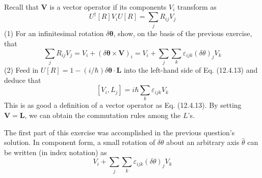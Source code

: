 \documentclass[../principles-of-quantum-mechanics.tex]{subfiles}
\begin{document}
\begin{questions}
	\question Recall that $\mathbf{V}$ is a vector operator if its components $V_i$ transform as
	$$U^\dagger[R]V_iU[R] = \sum_j R_{ij} V_j$$
	(1) For an infinitesimal rotation $\delta\boldsymbol{\theta}$, show, on the basis of the previous exercise, that
	$$\sum_j R_{ij}V_j = V_i + (\delta\boldsymbol{\theta}\times\mathbf{V})_i = V_i + \sum_j\sum_k\varepsilon_{ijk}(\delta\theta)_jV_k$$
	(2) Feed in $U[R] = 1 - (i/\hbar)\delta\boldsymbol{\theta}\cdot\mathbf{L}$ into the left-hand side of Eq. (12.4.13) and deduce that
	$$[V_i, L_j] = i\hbar\sum_k \varepsilon_{ijk}V_k$$
	This is as good a definition of a vector operator as Eq. (12.4.13). By setting $\mathbf{V} = \mathbf{L}$, we can obtain the commutation rules among the $L$'s.
	
	\begin{solution}
		The first part of this exercise was accomplished in the previous question's solution. In component form, a small rotation of $\delta\theta$ about an arbitrary axis $\hat{\theta}$ can be written (in index notation) as
		$$V_i + \sum_j\sum_k\varepsilon_{ijk}(\delta\theta)_jV_k$$
	\end{solution}
	\end{questions}
\end{document}
